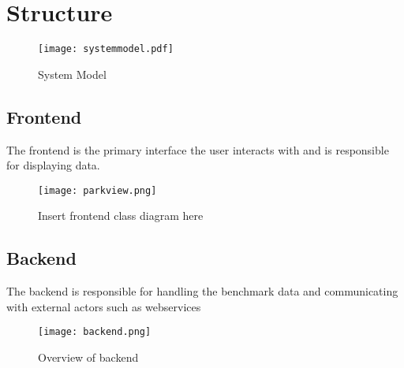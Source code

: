 \section{Structure}
\begin{figure}[h]
	\centering
	\texttt{[image: systemmodel.pdf]}
	\caption{System Model}
\end{figure}

\subsection{Frontend}
The frontend is the primary interface the user interacts with and is responsible for displaying data.
\begin{figure}[h]
	\centering
	\texttt{[image: parkview.png]}
	\caption{Insert frontend class diagram here}
\end{figure}

\subsection{Backend}
The backend is responsible for handling the benchmark data and communicating with external actors such as webservices
\begin{figure}[h]
	\centering
	\texttt{[image: backend.png]}
	\caption{Overview of backend}
\end{figure}
